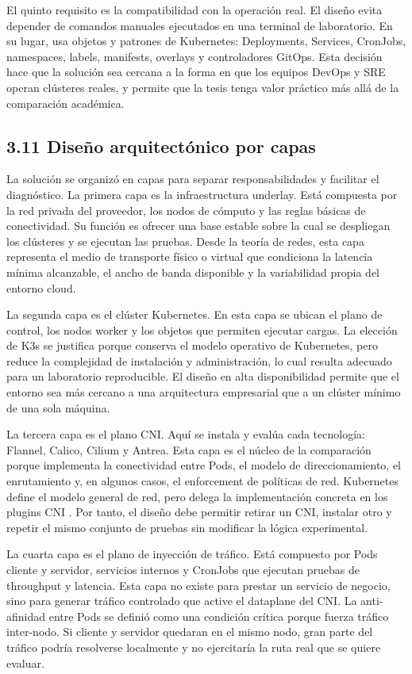 \documentclass[journal]{IEEEtran}
\begin{document}
El quinto requisito es la compatibilidad con la operación real. El diseño evita depender de comandos manuales ejecutados en una terminal de laboratorio. En su lugar, usa objetos y patrones de Kubernetes: Deployments, Services, CronJobs, namespaces, labels, manifests, overlays y controladores GitOps. Esta decisión hace que la solución sea cercana a la forma en que los equipos DevOps y SRE operan clústeres reales, y permite que la tesis tenga valor práctico más allá de la comparación académica.

\subsection{3.11 Diseño arquitectónico por capas}

La solución se organizó en capas para separar responsabilidades y facilitar el diagnóstico. La primera capa es la infraestructura underlay. Está compuesta por la red privada del proveedor, los nodos de cómputo y las reglas básicas de conectividad. Su función es ofrecer una base estable sobre la cual se despliegan los clústeres y se ejecutan las pruebas. Desde la teoría de redes, esta capa representa el medio de transporte físico o virtual que condiciona la latencia mínima alcanzable, el ancho de banda disponible y la variabilidad propia del entorno cloud.

La segunda capa es el clúster Kubernetes. En esta capa se ubican el plano de control, los nodos worker y los objetos que permiten ejecutar cargas. La elección de K3s se justifica porque conserva el modelo operativo de Kubernetes, pero reduce la complejidad de instalación y administración, lo cual resulta adecuado para un laboratorio reproducible. El diseño en alta disponibilidad permite que el entorno sea más cercano a una arquitectura empresarial que a un clúster mínimo de una sola máquina.

La tercera capa es el plano CNI. Aquí se instala y evalúa cada tecnología: Flannel, Calico, Cilium y Antrea. Esta capa es el núcleo de la comparación porque implementa la conectividad entre Pods, el modelo de direccionamiento, el enrutamiento y, en algunos casos, el enforcement de políticas de red. Kubernetes define el modelo general de red, pero delega la implementación concreta en los plugins CNI \cite{ref4,ref18}. Por tanto, el diseño debe permitir retirar un CNI, instalar otro y repetir el mismo conjunto de pruebas sin modificar la lógica experimental.

La cuarta capa es el plano de inyección de tráfico. Está compuesto por Pods cliente y servidor, servicios internos y CronJobs que ejecutan pruebas de throughput y latencia. Esta capa no existe para prestar un servicio de negocio, sino para generar tráfico controlado que active el dataplane del CNI. La anti-afinidad entre Pods se definió como una condición crítica porque fuerza tráfico inter-nodo. Si cliente y servidor quedaran en el mismo nodo, gran parte del tráfico podría resolverse localmente y no ejercitaría la ruta real que se quiere evaluar.
\end{document}
